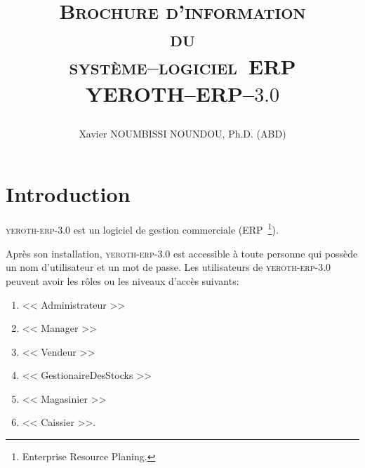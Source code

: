 \documentclass[a4paper, 10pt, twocolumn]{article}
\newcommand{\pos}{syst\`eme--logiciel~ERP\xspace}
\newcommand{\yerenpos}{\textcolor{yerenColorBlue}{\sc YEROTH--ERP--$3.0$}\xspace}
\newcommand{\myfullacademicname}{Xavier NOUMBISSI NOUNDOU, Ph.D. (ABD)\xspace}
\newcommand{\yeren}{\textsc{yeroth-erp-3.0}\xspace}
\newcommand{\manager}{<< Manager >>\xspace}
\newcommand{\caissier}{<< Caissier >>\xspace}
\newcommand{\administrateur}{<< Administrateur >>\xspace}
\newcommand{\magasinier}{<< Magasinier >>\xspace}
\newcommand{\vendeur}{<< Vendeur >>\xspace}
\newcommand{\gestionairedestocks}{<< GestionaireDesStocks >>\xspace}
\begin{document}

\title{
\vspace{-1.65em}
\textcolor{medgreen}{\textsc{Brochure d'information \\
										du \\
									 \pos \\ \vspace{1em}
									 \yerenpos}}
									 \author{\myfullacademicname}
}

\date{} 
\maketitle
\thispagestyle{fancy}



\vspace{-1.1em}
\section{Introduction}
\vspace{-0.9em}
\yeren est un logiciel de gestion commerciale
(ERP~\footnote{Enterprise Resource Planing.}).

Apr\`es son installation, \yeren est accessible \`a
toute personne qui poss\`ede un nom d'utilisateur et
un mot de passe.
Les utilisateurs de \yeren peuvent avoir les r\^oles ou 
les niveaux d'acc\`es suivants:
\begin{enumerate}[1)]
	\itemsep -0.6em
	\item \administrateur
	\item \manager
	\item \vendeur
	\item \gestionairedestocks
	\item \magasinier
	\item \caissier.
\end{enumerate}
\end{document}

